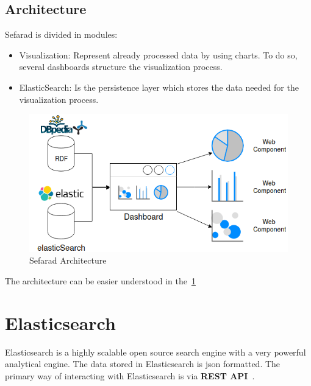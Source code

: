 \subsection{Architecture}
Sefarad is divided in modules:
\begin{itemize}
	\item Visualization: Represent already processed data by using charts. To do so, several dashboards structure the visualization process.
	\item ElasticSearch: Is the persistence layer which stores the data needed for the visualization process.
\end{itemize}
\begin{figure}
	\includegraphics[width=\linewidth]{img/sefarad_architecture.png}
	\caption{Sefarad Architecture~\cite{sefarad}}
	\label{fig:sefaradarch}
\end{figure}
The architecture can be easier understood in the~\cref{fig:sefaradarch}
\section{Elasticsearch}
Elasticsearch is a highly scalable open source search engine with a very powerful analytical engine. The data stored in Elasticsearch is \ac{json} formatted. The primary way of interacting with Elasticsearch is via \textbf{REST API}~\cite{elastic1}.

